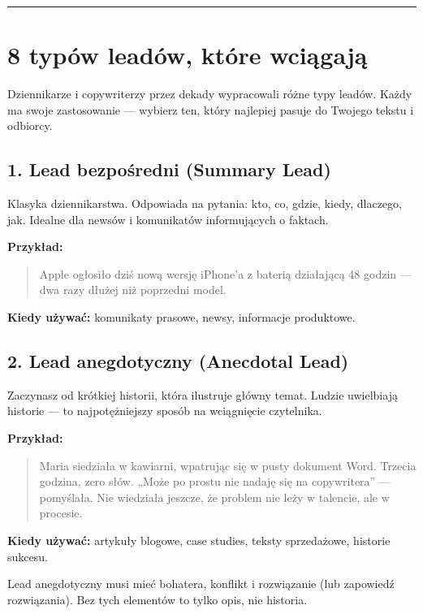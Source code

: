 \documentclass[
  12pt,
  a4paper,
  twoside,
  openright,
  12pt,
  DIV=12,
  BCOR=12mm]{scrbook}
\newcommand{\decoline}{%
  \begin{center}
    \textcolor{bordergray}{\rule{0.3\textwidth}{0.5pt}}
  \end{center}
}
\begin{document}
\decoline

\section{8 typów leadów, które
wciągają}\label{typuxf3w-leaduxf3w-ktuxf3re-wciux105gajux105}

Dziennikarze i copywriterzy przez dekady wypracowali różne typy leadów.
Każdy ma swoje zastosowanie --- wybierz ten, który najlepiej pasuje do
Twojego tekstu i odbiorcy.

\subsection{1. Lead bezpośredni (Summary
Lead)}\label{lead-bezpoux15bredni-summary-lead}

Klasyka dziennikarstwa. Odpowiada na pytania: kto, co, gdzie, kiedy,
dlaczego, jak. Idealne dla newsów i komunikatów informujących o faktach.

\textbf{Przykład:}

\begin{quote}
Apple ogłosiło dziś nową wersję iPhone'a z baterią działającą 48 godzin
--- dwa razy dłużej niż poprzedni model.
\end{quote}

\textbf{Kiedy używać:} komunikaty prasowe, newsy, informacje produktowe.

\subsection{2. Lead anegdotyczny (Anecdotal
Lead)}\label{lead-anegdotyczny-anecdotal-lead}

Zaczynasz od krótkiej historii, która ilustruje główny temat. Ludzie
uwielbiają historie --- to najpotężniejszy sposób na wciągnięcie
czytelnika.

\textbf{Przykład:}

\begin{quote}
Maria siedziała w kawiarni, wpatrując się w pusty dokument Word. Trzecia
godzina, zero słów. „Może po prostu nie nadaję się na copywritera'' ---
pomyślała. Nie wiedziała jeszcze, że problem nie leży w talencie, ale w
procesie.
\end{quote}

\textbf{Kiedy używać:} artykuły blogowe, case studies, teksty
sprzedażowe, historie sukcesu.

\begin{wskazowka}
Lead anegdotyczny musi mieć bohatera, konflikt i rozwiązanie (lub zapowiedź rozwiązania). Bez tych elementów to tylko opis, nie historia.
\end{wskazowka}
\end{document}
